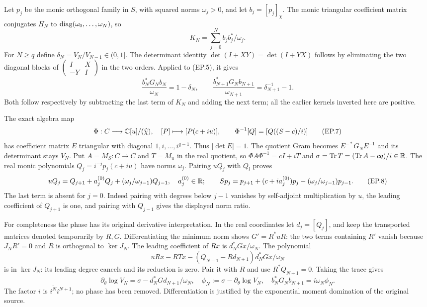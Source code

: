Let $p_j$ be the monic orthogonal family in $S$, with squared norms
$\omega_j>0$, and let $b_j=[p_j]_\chi$. The monic triangular
coefficient matrix conjugates $H_N$ to
$\operatorname{diag}(\omega_0,\ldots,\omega_N)$, so
\[
 K_N=\sum_{j=0}^N b_jb_j^*/\omega_j.\tag{EP.5}
\]
For $N\ge q$ define $\delta_N=V_N/V_{N-1}\in(0,1]$.
The determinant identity $\det(I+XY)=\det(I+YX)$ follows by
eliminating the two diagonal blocks of
$\left(\begin{smallmatrix}I&X\\-Y&I\end{smallmatrix}\right)$
in the two orders. Applied to (EP.5), it gives
\[
 \frac{b_N^*G_Nb_N}{\omega_N}=1-\delta_N,\qquad
 \frac{b_{N+1}^*G_Nb_{N+1}}{\omega_{N+1}}
 =\delta_{N+1}^{-1}-1.\tag{EP.6}
\]
Both follow respectively by subtracting the last term of $K_N$ and
adding the next term; all the earlier kernels inverted here are positive.

The exact algebra map
\[
 \Phi:C\longrightarrow\mathbb C[u]/(\widehat\chi),\quad
 [P]\longmapsto[P(c+iu)],\qquad
 \Phi^{-1}[Q]=[Q((S-c)/i)]\tag{EP.7}
\]
has coefficient matrix $E$ triangular with diagonal $1,i,\ldots,i^{q-1}$.
Thus $|\det E|=1$. The quotient Gram becomes
$E^{-*}G_NE^{-1}$ and its determinant stays $V_N$.
Put $A=M_S:C\to C$ and $T=M_u$ in the real quotient, so
$\Phi A\Phi^{-1}=cI+iT$ and
$\sigma=\operatorname{Tr} T=(\operatorname{Tr} A-cq)/i\in\mathbb R$.
The real monic polynomials $Q_j=i^{-j}p_j(c+iu)$ have norms
$\omega_j$. Pairing $uQ_j$ with $Q_l$ proves
\[
 uQ_j=Q_{j+1}+a_j^{(0)}Q_j+
       (\omega_j/\omega_{j-1})Q_{j-1},\quad a_j^{(0)}\in\mathbb R;
 \qquad
 Sp_j=p_{j+1}+(c+ia_j^{(0)})p_j-
       (\omega_j/\omega_{j-1})p_{j-1}.\tag{EP.8}
\]
The last term is absent for $j=0$. Indeed pairing with degrees below
$j-1$ vanishes by self-adjoint multiplication by $u$, the leading
coefficient of $Q_{j+1}$ is one, and pairing with $Q_{j-1}$ gives
the displayed norm ratio.

For completeness the phase has its original derivative interpretation.
In the real coordinates let $d_j=[Q_j]$, and keep the transported
matrices denoted temporarily by $R,G$. Differentiating the minimum
norm shows $G'=R^*uR$: the two terms containing $R'$ vanish because
$J_NR'=0$ and $R$ is orthogonal to $\ker J_N$. The leading
coefficient of $Rx$ is $d_N^*Gx/\omega_N$. The polynomial
\[
 uRx-RTx-(Q_{N+1}-Rd_{N+1})d_N^*Gx/\omega_N
\]
is in $\ker J_N$: its leading degree cancels and its reduction is zero.
Pair it with $R$ and use $R^*Q_{N+1}=0$. Taking the trace gives
\[
 \partial_\theta\log V_N
 =\sigma-d_N^*Gd_{N+1}/\omega_N,
 \quad \phi_N:=\sigma-\partial_\theta\log V_N,
 \quad b_N^*G_Nb_{N+1}=i\omega_N\phi_N.\tag{EP.9}
\]
The factor $i$ is $\overline{i^N}i^{N+1}$; no phase has been removed.
Differentiation is justified by the exponential moment domination of
the original source.

